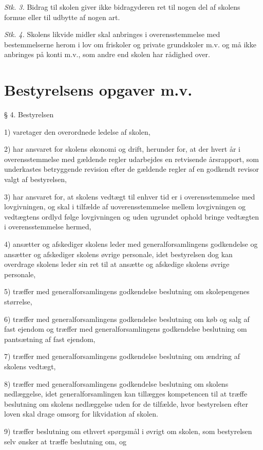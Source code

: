 \documentclass[11pt, a4paper]{article}
\begin{document}
\textit{Stk. 3.} Bidrag til skolen giver ikke bidragyderen ret til nogen del af skolens formue eller til udbytte af nogen art.

\textit{Stk. 4.} Skolens likvide midler skal anbringes i overensstemmelse med bestemmelserne herom i lov om friskoler og private grundskoler m.v. og må ikke anbringes på konti m.v., som andre end skolen har rådighed over.

\section{Bestyrelsens opgaver m.v.}
§ 4. Bestyrelsen

1) varetager den overordnede ledelse af skolen,

2) har ansvaret for skolens økonomi og drift, herunder for, at der hvert år i overensstemmelse med gældende regler udarbejdes en retvisende årsrapport, som underkastes betryggende revision efter de gældende regler af en godkendt revisor valgt af bestyrelsen,

3) har ansvaret for, at skolens vedtægt til enhver tid er i overensstemmelse med lovgivningen, og skal i tilfælde af uoverensstemmelse mellem lovgivningen og vedtægtens ordlyd følge lovgivningen og uden ugrundet ophold bringe vedtægten i overensstemmelse hermed,

4) ansætter og afskediger skolens leder med generalforsamlingens godkendelse og ansætter og afskediger skolens øvrige personale, idet bestyrelsen dog kan overdrage skolens leder sin ret til at ansætte og afskedige skolens øvrige personale,

5) træffer med generalforsamlingens godkendelse beslutning om skolepengenes størrelse,

6) træffer med generalforsamlingens godkendelse beslutning om køb og salg af fast ejendom og træffer med generalforsamlingens godkendelse beslutning om pantsætning af fast ejendom,

7) træffer med generalforsamlingens godkendelse beslutning om ændring af skolens vedtægt,

8) træffer med generalforsamlingens godkendelse beslutning om skolens nedlæggelse, idet generalforsamlingen kan tillægges kompetencen til at træffe beslutning om skolens nedlæggelse uden for de tilfælde, hvor bestyrelsen efter loven skal drage omsorg for likvidation af skolen.

9) træffer beslutning om ethvert spørgsmål i øvrigt om skolen, som bestyrelsen selv ønsker at træffe beslutning om, og
\end{document}
